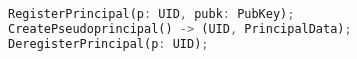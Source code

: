 \begin{figure}[t]
\begin{lstlisting}[language=Rust, style=rust]
RegisterPrincipal(p: UID, pubk: PubKey);
CreatePseudoprincipal() -> (UID, PrincipalData);
DeregisterPrincipal(p: UID);


\end{lstlisting}
\end{figure}
